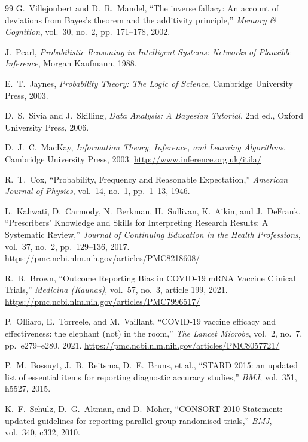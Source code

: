 \documentclass[11pt]{article}
\begin{document}
\begin{thebibliography}{99}
G.\ Villejoubert and D.\ R.\ Mandel,
``The inverse fallacy: An account of deviations from Bayes's theorem and the additivity principle,''
\emph{Memory \& Cognition}, vol.\ 30, no.\ 2, pp.\ 171--178, 2002.

J.\ Pearl,
\emph{Probabilistic Reasoning in Intelligent Systems: Networks of Plausible Inference},
Morgan Kaufmann, 1988.

E.\ T.\ Jaynes,
\emph{Probability Theory: The Logic of Science},
Cambridge University Press, 2003.

D.\ S.\ Sivia and J.\ Skilling,
\emph{Data Analysis: A Bayesian Tutorial}, 2nd ed.,
Oxford University Press, 2006.

D.\ J.\ C.\ MacKay,
\emph{Information Theory, Inference, and Learning Algorithms},
Cambridge University Press, 2003.
\url{http://www.inference.org.uk/itila/}

R.\ T.\ Cox,
``Probability, Frequency and Reasonable Expectation,''
\emph{American Journal of Physics}, vol.\ 14, no.\ 1, pp.\ 1--13, 1946.

L.\ Kahwati, D.\ Carmody, N.\ Berkman, H.\ Sullivan, K.\ Aikin, and J.\ DeFrank,
``Prescribers' Knowledge and Skills for Interpreting Research Results: A Systematic Review,''
\emph{Journal of Continuing Education in the Health Professions}, vol.\ 37, no.\ 2, pp.\ 129--136, 2017.
\url{https://pmc.ncbi.nlm.nih.gov/articles/PMC8218608/}

R.\ B.\ Brown,
``Outcome Reporting Bias in COVID-19 mRNA Vaccine Clinical Trials,''
\emph{Medicina (Kaunas)}, vol.\ 57, no.\ 3, article 199, 2021.
\url{https://pmc.ncbi.nlm.nih.gov/articles/PMC7996517/}

P.\ Olliaro, E.\ Torreele, and M.\ Vaillant,
``COVID-19 vaccine efficacy and effectiveness: the elephant (not) in the room,''
\emph{The Lancet Microbe}, vol.\ 2, no.\ 7, pp.\ e279--e280, 2021.
\url{https://pmc.ncbi.nlm.nih.gov/articles/PMC8057721/}

P.\ M.\ Bossuyt, J.\ B.\ Reitsma, D.\ E.\ Bruns, et al.,
``STARD 2015: an updated list of essential items for reporting diagnostic accuracy studies,''
\emph{BMJ}, vol.\ 351, h5527, 2015.

K.\ F.\ Schulz, D.\ G.\ Altman, and D.\ Moher,
``CONSORT 2010 Statement: updated guidelines for reporting parallel group randomised trials,''
\emph{BMJ}, vol.\ 340, c332, 2010.


\end{thebibliography}
\end{document}
